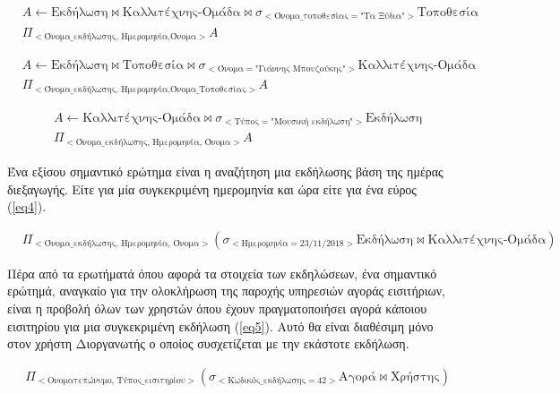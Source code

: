 \begin{equation} \label{eq1}
\begin{split}
&A \leftarrow \text{Εκδήλωση} \bowtie
\text{Καλλιτέχνης-Ομάδα} \bowtie
\sigma_{<\text{Όνομα\_τοποθεσίας} = \text{"Τα Ξύδια"}>}
\text{Τοποθεσία}
\\
&\Pi_{<\text{Όνομα\_εκδήλωσης, Ημερομηνία,Όνομα}>}A
\end{split}
\end{equation}

\begin{equation} \label{eq2}
\begin{split}
&A \leftarrow \text{Εκδήλωση} \bowtie
\text{Τοποθεσία} \bowtie
\sigma_{<\text{Όνομα} = \text{"Γιάννης Μπουζούκης"}>}
\text{Καλλιτέχνης-Ομάδα}
\\
&\Pi_{<\text{Όνομα\_εκδήλωσης, Ημερομηνία,Όνομα\_Τοποθεσίας}>}A
\end{split}
\end{equation}

\begin{equation} \label{eq3}
\begin{split}
&A \leftarrow \text{Καλλιτέχνης-Ομάδα} \bowtie
\sigma_{<\text{Τύπος} = \text{"Μουσική εκδήλωση"}>}\text{Εκδήλωση}
\\
&\Pi_{<\text{Όνομα\_εκδήλωσης, Ημερομηνία, Όνομα}>}A
\end{split}
\end{equation}

Ένα εξίσου σημαντικό ερώτημα  είναι η αναζήτηση μια εκδήλωσης βάση της
ημέρας διεξαγωγής. Είτε για μία συγκεκριμένη ημερομηνία και ώρα είτε
για ένα εύρος (\ref{eq4}).

\begin{equation}
  \label{eq4}
  \begin{split}
    &\Pi_{<\text{Όνομα\_εκδήλωσης, Ημερομηνία, Όνομα}>}(
    \sigma_{<\text{Ημερομηνία} = 23/11/2018>} \text{Εκδήλωση} \bowtie
    \text{Καλλιτέχνης-Ομάδα})
  \end{split}
\end{equation}

Πέρα από τα ερωτήματά όπου αφορά τα στοιχεία των εκδηλώσεων, ένα
σημαντικό ερώτημά, αναγκαίο για την ολοκλήρωση της παροχής υπηρεσιών
αγοράς εισιτήριων, είναι η προβολή όλων των χρηστών όπου έχουν
πραγματοποιήσει αγορά κάποιου εισιτηρίου για μια συγκεκριμένη εκδήλωση
(\ref{eq5}). Αυτό θα είναι διαθέσιμη μόνο στον χρήστη Διοργανωτής ο
οποίος συσχετίζεται με την εκάστοτε εκδήλωση.

\begin{equation}
  \label{eq5}
  \begin{split}
    &\Pi_{<\text{Ονοματεπώνυμο, Τύπος\_εισιτηρίου}>}(
    \sigma_{<\text{Κωδικός\_εκδήλωσης} = 42>} \text{Αγορά} \bowtie
    \text{Χρήστης})
  \end{split}
\end{equation}

